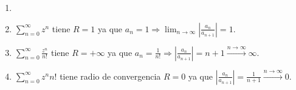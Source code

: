 \begin{ejm}
  \begin{enumerate}[label=(\roman*)]
    \item []
    \item $\sum_{n = 0}^{\infty} z^{n}$ tiene $R =1$ ya que $a_{n} = 1 \Rightarrow \lim_{n \to \infty} | \frac{a_{n}}{a_{n+1}} | = 1$.
    \item $\sum_{n = 0}^{\infty} \frac{z^{n}}{n!}$ tiene $R = + \infty$ ya que $a_{n} = \frac{1}{n!} \Rightarrow | \frac{a_{n}}{a_{n+1}} | = n +1 \xrightarrow[]{ n \rightarrow \infty } \infty$.
    \item $\sum_{n = 0}^{\infty} z^{n}n!$ tiene radio de convergencia $R = 0$ ya que $| \frac{a_{n}}{a_{n+1}} | = \frac{1}{n+1} \xrightarrow[]{ n \rightarrow \infty } 0$.
  \end{enumerate}
\end{ejm}
